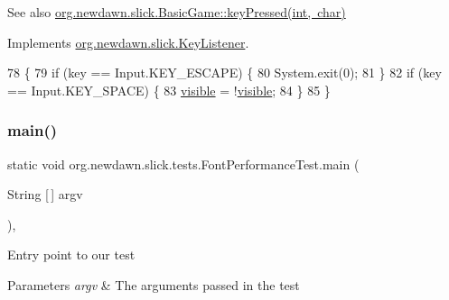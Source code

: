 \begin{DoxySeeAlso}{See also}
\mbox{\hyperlink{classorg_1_1newdawn_1_1slick_1_1_basic_game_a4fbb3345b5abf5ddd54a99466d07f02f}{org.\+newdawn.\+slick.\+Basic\+Game\+::key\+Pressed(int, char)}} 
\end{DoxySeeAlso}


Implements \mbox{\hyperlink{interfaceorg_1_1newdawn_1_1slick_1_1_key_listener_ac0b0568a21ef486c4f51382614c196ef}{org.\+newdawn.\+slick.\+Key\+Listener}}.


\begin{DoxyCode}
78                                             \{
79         \textcolor{keywordflow}{if} (key == Input.KEY\_ESCAPE) \{
80             System.exit(0);
81         \}
82         \textcolor{keywordflow}{if} (key == Input.KEY\_SPACE) \{
83             \mbox{\hyperlink{classorg_1_1newdawn_1_1slick_1_1tests_1_1_font_performance_test_a1ff056a4500b0f543cee4f88d13dabae}{visible}} = !\mbox{\hyperlink{classorg_1_1newdawn_1_1slick_1_1tests_1_1_font_performance_test_a1ff056a4500b0f543cee4f88d13dabae}{visible}};
84         \}
85     \}
\end{DoxyCode}
\mbox{\label{classorg_1_1newdawn_1_1slick_1_1tests_1_1_font_performance_test_ab323fe3f526a23b1bf728dbaf032a160}} 
\subsubsection{\texorpdfstring{main()}{main()}}
{\footnotesize\ttfamily static void org.\+newdawn.\+slick.\+tests.\+Font\+Performance\+Test.\+main (\begin{DoxyParamCaption}\item[{String \mbox{[}$\,$\mbox{]}}]{argv }\end{DoxyParamCaption})\hspace{0.3cm}{\ttfamily [inline]}, {\ttfamily [static]}}

Entry point to our test


\begin{DoxyParams}{Parameters}
{\em argv} & The arguments passed in the test \\
\hline
\end{DoxyParams}

